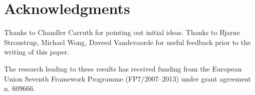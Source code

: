 \section*{Acknowledgments}

Thanks to Chandler Carruth for pointing out initial ideas. Thanks to Bjarne
Stroustrup, Michael Wong, Daveed Vandevoorde for useful feedback prior to the
writing of this paper.

The research leading to these results has received funding from the European
Union Seventh Framework Programme (FP7/2007--2013) under grant agreement n.
609666.
